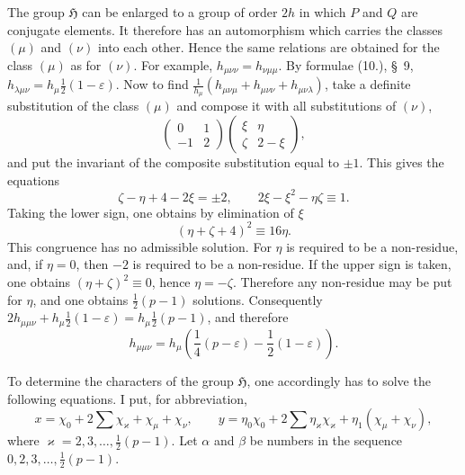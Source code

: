 \documentclass[11pt]{article}
\newcommand{\grp}{\mathfrak{H}}
\begin{document}
The group $\grp$ can be enlarged to a group of order $2h$ in which $P$ and $Q$ are conjugate elements. It therefore has an automorphism which carries the classes $(\mu)$ and $(\nu)$ into each other. Hence the same relations are obtained for the class $(\mu)$ as for $(\nu)$. For example, $h_{\mu\nu\nu}=h_{\nu\mu\mu}$. By formulae (10.), \S~9, $h_{\lambda\mu\nu}=h_\mu\frac12(1-\varepsilon)$. Now to find $\frac{1}{h_\mu}(h_{\mu\nu\mu}+h_{\mu\nu\nu}+h_{\mu\nu\lambda})$, take a definite substitution of the class $(\mu)$ and compose it with all substitutions of $(\nu)$,
\[
\begin{pmatrix}0&1\\-1&2\end{pmatrix}
\begin{pmatrix}\xi&\eta\\ \zeta&2-\xi\end{pmatrix},
\]
and put the invariant of the composite substitution equal to $\pm1$. This gives the equations
\[
\zeta-\eta+4-2\xi=\pm2,\qquad
2\xi-\xi^2-\eta\zeta\equiv1.
\]
Taking the lower sign, one obtains by elimination of $\xi$
\[
(\eta+\zeta+4)^2\equiv16\eta.
\]
This congruence has no admissible solution. For $\eta$ is required to be a non-residue, and, if $\eta=0$, then $-2$ is required to be a non-residue. If the upper sign is taken, one obtains $(\eta+\zeta)^2\equiv0$, hence $\eta=-\zeta$. Therefore any non-residue may be put for $\eta$, and one obtains $\frac12(p-1)$ solutions. Consequently $2h_{\mu\mu\nu}+h_\mu\frac12(1-\varepsilon)=h_\mu\frac12(p-1)$, and therefore
\[
h_{\mu\mu\nu}=h_\mu\left(\frac14(p-\varepsilon)-\frac12(1-\varepsilon)\right).
\]

To determine the characters of the group $\grp$, one accordingly has to solve the following equations. I put, for abbreviation,
\[
x=\chi_0+2\sum\chi_\varkappa+\chi_\mu+\chi_\nu,\qquad
y=\eta_0\chi_0+2\sum\eta_\varkappa\chi_\varkappa+\eta_1(\chi_\mu+\chi_\nu),
\]
where $\varkappa=2,3,\ldots,\frac12(p-1)$. Let $\alpha$ and $\beta$ be numbers in the sequence $0,2,3,\ldots,\frac12(p-1)$.
\end{document}
